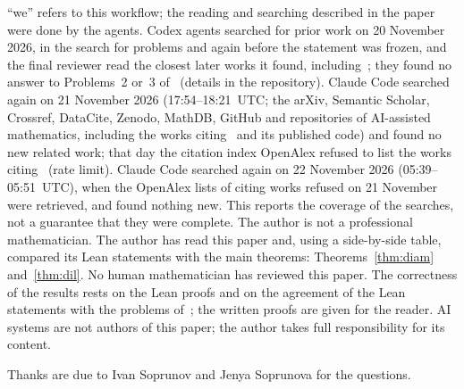 \documentclass[11pt]{article}
\theoremstyle{definition}
\theoremstyle{remark}
\begin{document}
``we'' refers to this workflow; the reading and searching described in the
paper were done by the agents. Codex agents searched for prior work on
20 November 2026, in the search for problems and again before the statement
was frozen, and the final reviewer read the closest later works it found,
including~\cite{bs,mss}; they found no answer to Problems~2 or~3
of~\cite{ss} (details in the repository). Claude Code searched again on 21 November 2026 (17:54--18:21~UTC; the arXiv, Semantic Scholar, Crossref, DataCite, Zenodo, MathDB, GitHub and repositories of AI-assisted mathematics, including the works citing~\cite{mss} and its published code) and found no new related work; that day the citation index OpenAlex refused to list the works citing~\cite{ss} (rate limit). Claude Code searched again on 22 November 2026 (05:39--05:51~UTC), when the OpenAlex lists of citing works refused on 21 November were retrieved, and found nothing new. This reports the
coverage of the searches, not a guarantee that they were complete. The author
is not a professional mathematician. The author has read this paper and, using a side-by-side table, compared its Lean statements with the main theorems: Theorems~\ref{thm:diam} and~\ref{thm:dil}. No human mathematician has
reviewed this paper. The correctness of the results rests on the Lean proofs
and on the agreement of the Lean statements with the problems of~\cite{ss};
the written proofs are given for the reader. AI systems are not authors of
this paper; the author takes full responsibility for its content.

\medskip
\noindent Thanks are due to Ivan Soprunov and Jenya Soprunova for the
questions.
\end{document}
